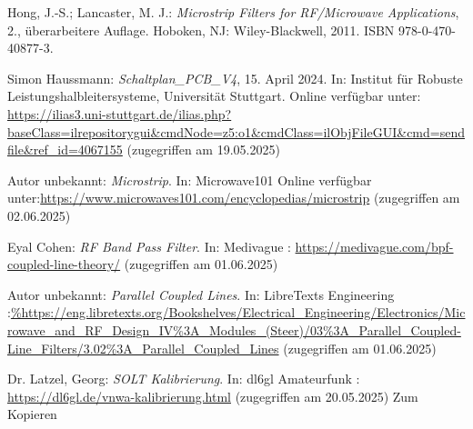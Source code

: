 
\begin{thebibliography}{1}
Hong, J.-S.; Lancaster, M. J.: \emph{Microstrip Filters for RF/Microwave Applications}, 2., überarbeitere Auflage. Hoboken, NJ: Wiley-Blackwell, 2011. ISBN 978-0-470-40877-3.

Simon Haussmann: \emph{Schaltplan\_PCB\_V4}, 15. April 2024. In: Institut für Robuste Leistungshalbleitersysteme, Universität Stuttgart. Online verfügbar unter: \url{https://ilias3.uni-stuttgart.de/ilias.php?baseClass=ilrepositorygui&cmdNode=z5:o1&cmdClass=ilObjFileGUI&cmd=sendfile&ref_id=4067155} (zugegriffen am 19.05.2025)


Autor unbekannt: \emph{Microstrip}. In: Microwave101 Online verfügbar unter:\url{https://www.microwaves101.com/encyclopedias/microstrip} (zugegriffen am 02.06.2025)


Eyal Cohen: \emph{RF Band Pass Filter}. In: Medivague : \url{https://medivague.com/bpf-coupled-line-theory/} (zugegriffen am 01.06.2025)

Autor unbekannt: \emph{Parallel Coupled Lines}. In: LibreTexts Engineering :\url{%https://eng.libretexts.org/Bookshelves/Electrical_Engineering/Electronics/Microwave_and_RF_Design_IV%3A_Modules_(Steer)/03%3A_Parallel_Coupled-Line_Filters/3.02%3A_Parallel_Coupled_Lines} (zugegriffen am 01.06.2025)


Dr.  Latzel, Georg: \emph{SOLT Kalibrierung}. In: dl6gl Amateurfunk : \url{https://dl6gl.de/vnwa-kalibrierung.html} (zugegriffen am 20.05.2025) Zum Kopieren
  





\end{thebibliography}

\clearpage
